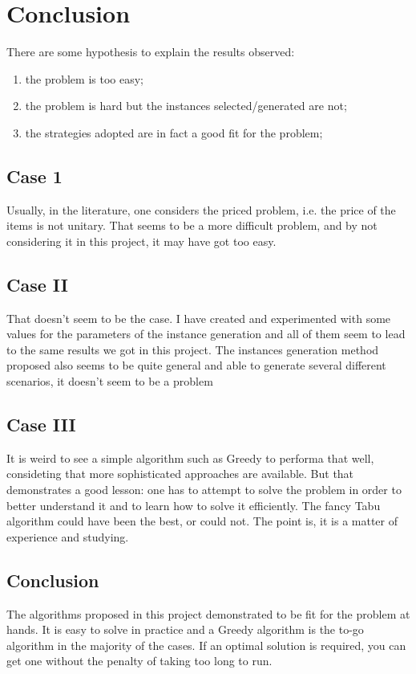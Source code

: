 \section{Conclusion}

There are some hypothesis to explain the results observed:

\begin{enumerate}
    \item the problem is too easy;
    \item the problem is hard but the instances selected/generated are not;
    \item the strategies adopted are in fact a good fit for the problem;
\end{enumerate}

\subsection{Case 1}

Usually, in the literature, one considers the priced problem, i.e. the price of the items is not unitary. That seems to be a more difficult problem, and by not considering it in this project, it may have got too easy.

\subsection{Case II}

That doesn't seem to be the case. I have created and experimented with some values for the parameters of the instance generation and all of them seem to lead to the same results we got in this project. The instances generation method proposed also seems to be quite general and able to generate several different scenarios, it doesn't seem to be a problem

\subsection{Case III}

It is weird to see a simple algorithm such as Greedy to performa that well, consideting that more sophisticated approaches are available. But that demonstrates a good lesson: one has to attempt to solve the problem in order to better understand it and to learn how to solve it efficiently. The fancy Tabu algorithm could have been the best, or could not. The point is, it is a matter of experience and studying.

\subsection{Conclusion}

The algorithms proposed in this project demonstrated to be fit for the problem at hands. It is easy to solve in practice and a Greedy algorithm is the to-go algorithm in the majority of the cases. If an optimal solution is required, you can get one without the penalty of taking too long to run.
